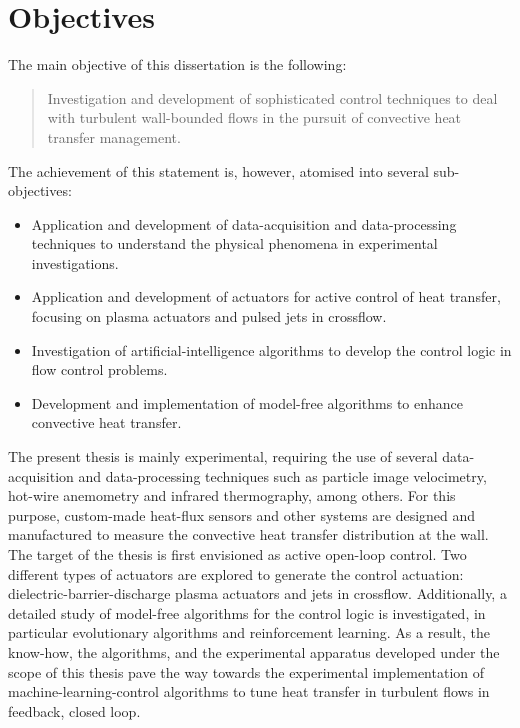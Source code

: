\section{Objectives}
%
The main objective of this dissertation is the following:
%
\begin{quote}
Investigation and development of sophisticated control techniques to deal with turbulent wall-bounded flows in the pursuit of convective heat transfer management.
\end{quote}
%
\noindent The achievement of this statement is, however, atomised into several sub-objectives:
%
\begin{itemize}
\item Application and development of data-acquisition and data-processing techniques to understand the physical phenomena in experimental investigations.
\item Application and development of actuators for active control of heat transfer, focusing on plasma actuators and pulsed jets in crossflow.
\item Investigation of artificial-intelligence algorithms to develop the control logic in flow control problems.
\item Development and implementation of model-free algorithms to enhance convective heat transfer.
\end{itemize}
%
The present thesis is mainly experimental, requiring the use of several data-acquisition and data-processing techniques such as particle image velocimetry, hot-wire anemometry and infrared thermography, among others. For this purpose, custom-made heat-flux sensors and other systems are designed and manufactured to measure the convective heat transfer distribution at the wall. The target of the thesis is first envisioned as active open-loop control. Two different types of actuators are explored to generate the control actuation: dielectric-barrier-discharge plasma actuators and jets in crossflow. Additionally, a detailed study of model-free algorithms for the control logic is investigated, in particular evolutionary algorithms and reinforcement learning. As a result, the know-how, the algorithms, and the experimental apparatus developed under the scope of this thesis pave the way towards the experimental implementation of machine-learning-control algorithms to tune heat transfer in turbulent flows in feedback, closed loop.

